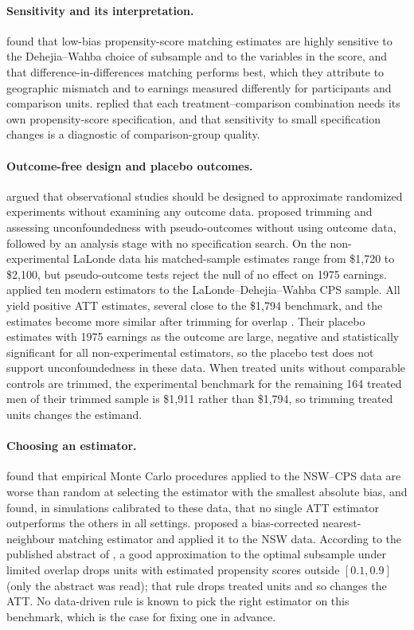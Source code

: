 \documentclass[11pt]{article}
\begin{document}
\paragraph{Sensitivity and its interpretation.} \citet{smith2005} found that low-bias
propensity-score matching estimates are highly sensitive to the Dehejia--Wahba choice of
subsample and to the variables in the score, and that difference-in-differences matching
performs best, which they attribute to geographic mismatch and to earnings measured
differently for participants and comparison units. \citet{dehejia2005} replied that each
treatment--comparison combination needs its own propensity-score specification, and that
sensitivity to small specification changes is a diagnostic of comparison-group quality.

\paragraph{Outcome-free design and placebo outcomes.} \citet{rubin2008} argued that
observational studies should be designed to approximate randomized experiments without
examining any outcome data. \citet{imbens2015} proposed trimming and assessing
unconfoundedness with pseudo-outcomes without using outcome data, followed by an analysis
stage with no specification search. On the non-experimental LaLonde data his matched-sample
estimates range from \$1,720 to \$2,100, but pseudo-outcome tests reject the null of no
effect on 1975 earnings. \citet{imbens2025} applied ten modern estimators to the
LaLonde--Dehejia--Wahba CPS sample. All yield positive ATT estimates, several close to the
\$1,794 benchmark, and the estimates become more similar after trimming for overlap
\citep{imbens2025,xu2024tutorial}. Their placebo estimates with 1975 earnings as the outcome
are large, negative and statistically significant for all non-experimental estimators, so
the placebo test does not support unconfoundedness in these data. When treated units without
comparable controls are trimmed, the experimental benchmark for the remaining 164 treated
men of their trimmed sample is \$1,911 rather than \$1,794, so trimming treated units changes
the estimand.

\paragraph{Choosing an estimator.} \citet{advani2019} found that empirical Monte Carlo
procedures applied to the NSW--CPS data are worse than random at selecting the estimator
with the smallest absolute bias, and \citet{athey2024} found, in simulations calibrated to
these data, that no single ATT estimator outperforms the others in all settings.
\citet{abadie2011} proposed a bias-corrected nearest-neighbour matching estimator and applied
it to the NSW data. According to the published abstract of \citet{crump2009}, a good approximation to the optimal
subsample under limited overlap drops units with estimated propensity scores outside
$[0.1, 0.9]$ (only the abstract was read); that rule drops treated units and so changes the ATT. No data-driven rule is
known to pick the right estimator on this benchmark, which is the case for fixing one in
advance.
\end{document}

